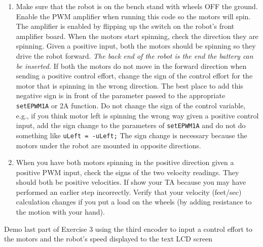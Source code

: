 \documentclass[11pt]{article}
\begin{document}
\begin{enumerate}
        \item Make sure that the robot is on the bench stand with wheels OFF the ground. Enable the PWM amplifier when running this code so the motors will spin. The amplifier is enabled by flipping up the switch on the robot’s front amplifier board. When the motors start spinning, check the direction they are spinning. Given a positive input, both the motors should be spinning so they drive the robot forward. \textit{The back end of the robot is the end the battery can be inserted.} If both the motors do not move in the forward direction when sending a positive control effort, change the sign of the control effort for the motor that is spinning in the wrong direction. The best place to add this negative sign is in front of the parameter passed to the appropriate \texttt{setEPWM1A} or 2A function. Do not change the sign of the control variable, e.g., if you think motor left is spinning the wrong way given a positive control input, add the sign change to the parameters of \texttt{setEPWM1A} and do not do something like \texttt{uLeft = -uLeft;} The sign change is necessary because the motors under the robot are mounted in opposite directions.
    \item When you have both motors spinning in the positive direction given a positive PWM input, check the signs of the two velocity readings. They should both be positive velocities. If show your TA because you may have performed an earlier step incorrectly. Verify that your velocity (feet/sec) calculation changes if you put a load on the wheels (by adding resistance to the motion with your hand).
\end{enumerate}
%
\begin{checkoff}
        Demo last part of Exercise 3 using the third encoder to input a control effort to the motors and the robot’s speed displayed to the text LCD screen
\end{checkoff}
%
\end{document}
